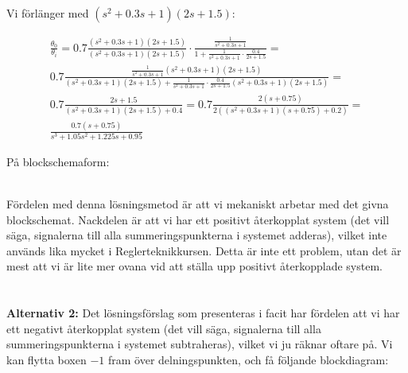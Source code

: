 \documentclass[a4paper]{article}
\begin{document}
Vi förlänger med $(s^2 + 0.3s + 1)(2s+1.5)$:

\begin{align*}
  \frac{\theta_0}{\theta_i} = 0.7 \frac{(s^2 + 0.3s + 1)(2s+1.5)}{(s^2 + 0.3s + 1)(2s+1.5)} \cdot \frac{\frac{1}{s^2 + 0.3s + 1}}{1+\frac{1}{s^2 + 0.3s + 1}\cdot \frac{0.4}{2s+1.5}} = \\
  0.7 \frac{\frac{1}{s^2 + 0.3s + 1} (s^2 + 0.3s + 1)(2s+1.5)}{(s^2 + 0.3s + 1)(2s+1.5) + \frac{1}{s^2 + 0.3s + 1}\cdot \frac{0.4}{2s+1.5} (s^2 + 0.3s + 1)(2s+1.5)} = \\
  0.7 \frac{2s+1.5}{(s^2 + 0.3s + 1)(2s+1.5) + 0.4} = 0.7 \frac{2(s+0.75)}{2((s^2 + 0.3s + 1)(s+0.75) + 0.2)} = \\
  \frac{0.7(s+0.75)}{s^3 + 1.05s^2 + 1.225s + 0.95}
\end{align*}


På blockschemaform:\\

\\


Fördelen med denna lösningsmetod är att vi mekaniskt arbetar med det givna blockschemat. Nackdelen är att vi har ett positivt återkopplat system (det vill säga, signalerna till alla summeringspunkterna i systemet adderas), vilket inte används lika mycket i Reglerteknikkursen. Detta är inte ett problem, utan det är mest att vi är lite mer ovana vid att ställa upp positivt återkopplade system.
\\\\\\


\textbf{Alternativ 2:} Det lösningsförslag som presenteras i facit har fördelen att vi har ett negativt återkopplat system (det vill säga, signalerna till alla summeringspunkterna i systemet subtraheras), vilket vi ju räknar oftare på. Vi kan flytta boxen $-1$ fram över delningspunkten, och få följande blockdiagram:\\
\end{document}
